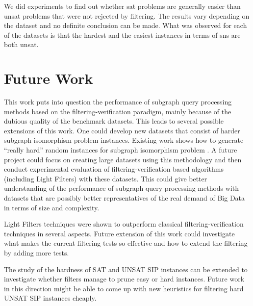 \documentclass{l4proj}
\begin{document}

We did experiments to find out whether \gls{sat} problems are generally easier than \gls{unsat} problems that were not rejected by filtering. The results vary depending on the dataset and no definite conclusion can be made. What was observed for each of the datasets is that the hardest and the easiest instances in terms of \glspl{sn} are both \gls{unsat}.  

\section{Future Work}
This work puts into question the performance of subgraph query processing methods based on the filtering-verification paradigm, mainly because of the dubious quality of the benchmark datasets. This leads to several possible extensions of this work. %
One could develop new datasets that consist of harder subgraph isomorphism problem instances. Existing work shows how to generate ``really hard'' random instances for subgraph isomorphism problem \cite{patrick:2015}. A future project could focus on creating large datasets using this methodology and then conduct experimental evaluation of filtering-verification based algorithms (including Light Filters) with these datasets. This could give better understanding of the performance of subgraph query processing methods with datasets that are possibly better representatives of the real demand of Big Data in terms of size and complexity.

Light Filters techniques were shown to outperform classical filtering-verification techniques in several aspects. Future extension of this work could investigate what makes the current filtering tests so effective and how to extend the filtering by adding more tests.

The study of the hardness of SAT and UNSAT SIP instances can be extended to investigate whether filters manage to prune easy or hard instances. Future work in this direction might be able to come up with new heuristics for filtering hard UNSAT SIP instances cheaply.
\end{document}
